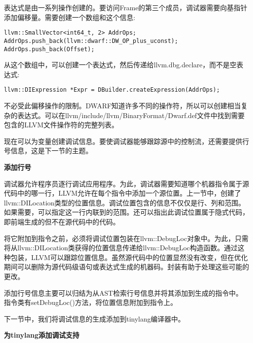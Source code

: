 表达式是由一系列操作创建的。要访问Frame的第三个成员，调试器需要向基指针添加偏移量。需要创建一个数组和这个信息:

\begin{lstlisting}[caption={}]
llvm::SmallVector<int64_t, 2> AddrOps;
AddrOps.push_back(llvm::dwarf::DW_OP_plus_uconst);
AddrOps.push_back(Offset);
\end{lstlisting}

从这个数组中，可以创建一个表达式，然后传递给llvm.dbg.declare，而不是空表达式:\par

\begin{lstlisting}[caption={}]
llvm::DIExpression *Expr = DBuilder.createExpression(AddrOps);
\end{lstlisting}

不必受此偏移操作的限制。DWARF知道许多不同的操作符，所以可以创建相当复杂的表达式。可以在llvm/include/llvm/BinaryFormat/Dwarf.def文件中找到需要包含的LLVM文件操作符的完整列表。\par

现在可以为变量创建调试信息。要使调试器能够跟踪源中的控制流，还需要提供行号信息，这是下一节的主题。\par


\hspace*{\fill} \par %
\textbf{添加行号}

调试器允许程序员逐行调试应用程序。为此，调试器需要知道哪个机器指令属于源代码中的哪一行，LLVM允许在每个指令中添加一个源位置。上一节中，创建了llvm::DILocation类型的位置信息。调试位置包含的信息不仅仅是行、列和范围。如果需要，可以指定这一行内联到的范围。还可以指出此调试位置属于隐式代码，即前端生成的但不在源代码中的代码。\par

将它附加到指令之前，必须将调试位置包装在llvm::DebugLoc对象中。为此，只需将从llvm::DI\allowbreak Location类获得的位置信息传递给llvm::DebugLoc构造函数。通过这种包装，LLVM可以跟踪位置信息。虽然源代码中的位置显然没有改变，但在优化期间可以删除为源代码级语句或表达式生成的机器码。封装有助于处理这些可能的更改。\par

添加行号信息主要可以归结为从AST检索行号信息并将其添加到生成的指令中。指令类有setDebugLoc()方法，将位置信息附加到指令上。\par

下一节中，我们将调试信息的生成添加到tinylang编译器中。\par

\hspace*{\fill} \par %
\textbf{为tinylang添加调试支持}

